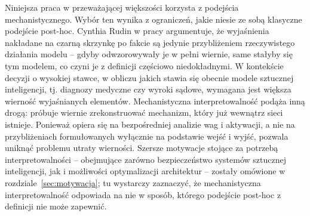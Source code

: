 Niniejsza praca w przeważającej większości korzysta z podejścia mechanistycznego. Wybór ten wynika z ograniczeń, jakie niesie ze sobą klasyczne podejście post-hoc. Cynthia Rudin w pracy \cite{rudin_stop_explaining_black_box_machine_learning_models} argumentuje, że wyjaśnienia nakładane na czarną skrzynkę po fakcie są jedynie przybliżeniem rzeczywistego działania modelu -- gdyby odwzorowywały je w pełni wiernie, same stałyby się tym modelem, co czyni je z definicji częściowo niedokładnymi. W kontekście decyzji o wysokiej stawce, w obliczu jakich stawia się obecnie modele sztucznej inteligencji, tj. diagnozy medyczne czy wyroki sądowe, wymagana jest większa wierność wyjaśnianych elementów. Mechanistyczna interpretowalność podąża inną drogą: próbuje wiernie zrekonstruować mechanizm, który już wewnątrz sieci istnieje. Ponieważ opiera się na bezpośredniej analizie wag i aktywacji, a nie na przybliżeniach formułowanych wyłącznie na podstawie wejść i wyjść, pozwala uniknąć problemu utraty wierności. \newline
Szersze motywacje stojące za potrzebą interpretowalności -- obejmujące zarówno bezpieczeństwo systemów sztucznej inteligencji, jak i możliwości optymalizacji architektur -- zostały omówione w rozdziale~\ref{sec:motywacja}; tu wystarczy zaznaczyć, że mechanistyczna interpretowalność odpowiada na nie w sposób, którego podejście post-hoc z definicji nie może zapewnić.


